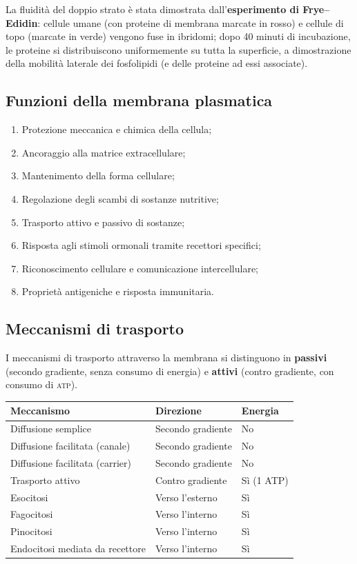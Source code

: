 \documentclass[11pt,a4paper,openright,twoside]{book}
\theoremstyle{definition}
\theoremstyle{plain}
\theoremstyle{remark}
\newcommand{\atp}{\textsc{atp}}
\begin{document}
La fluidità del doppio strato è stata dimostrata dall'\textbf{esperimento di Frye--Edidin}: cellule umane (con proteine di membrana marcate in rosso) e cellule di topo (marcate in verde) vengono fuse in ibridomi; dopo 40 minuti di incubazione, le proteine si distribuiscono uniformemente su tutta la superficie, a dimostrazione della mobilità laterale dei fosfolipidi (e delle proteine ad essi associate).

\subsection{Funzioni della membrana plasmatica}

\begin{enumerate}
  \item Protezione meccanica e chimica della cellula;
  \item Ancoraggio alla matrice extracellulare;
  \item Mantenimento della forma cellulare;
  \item Regolazione degli scambi di sostanze nutritive;
  \item Trasporto attivo e passivo di sostanze;
  \item Risposta agli stimoli ormonali tramite recettori specifici;
  \item Riconoscimento cellulare e comunicazione intercellulare;
  \item Proprietà antigeniche e risposta immunitaria.
\end{enumerate}

\subsection{Meccanismi di trasporto}

I meccanismi di trasporto attraverso la membrana si distinguono in \textbf{passivi} (secondo gradiente, senza consumo di energia) e \textbf{attivi} (contro gradiente, con consumo di \atp).

\begin{center}
\begin{tabular}{lll}
\toprule
\textbf{Meccanismo} & \textbf{Direzione} & \textbf{Energia} \\
\midrule
Diffusione semplice & Secondo gradiente & No \\
Diffusione facilitata (canale) & Secondo gradiente & No \\
Diffusione facilitata (carrier) & Secondo gradiente & No \\
Trasporto attivo & Contro gradiente & Sì (1 ATP) \\
Esocitosi & Verso l'esterno & Sì \\
Fagocitosi & Verso l'interno & Sì \\
Pinocitosi & Verso l'interno & Sì \\
Endocitosi mediata da recettore & Verso l'interno & Sì \\
\bottomrule
\end{tabular}
\end{center}
\end{document}
